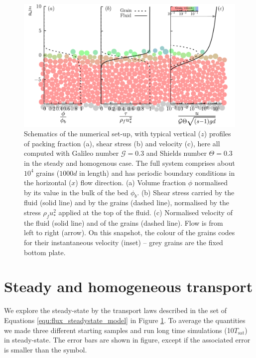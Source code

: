 \begin{figure}[H]
    \centering
    \includegraphics[width=0.9\linewidth]{04-figuras/TM-profiles.pdf}
    \caption[Transport profiles.]{Schematics of the numerical set-up, with typical vertical ($z$) profiles of packing fraction (a), shear stress (b) and velocity (c), here all computed with Galileo number $\mathcal{G}=0.3$ and Shields number $\Theta=0.3$ in the steady and homogenous case. The full system comprises about $10^4$ grains ($1000d$ in length) and has periodic boundary conditions in the horizontal ($x$) flow direction. (a) Volume fraction $\phi$ normalised by its value in the bulk of the bed $\phi_b$. (b) Shear stress carried by the fluid (solid line) and by the grains (dashed line), normalised by the stress $\rho_f u_*^2$ applied at the top of the fluid. (c) Normalised velocity of the fluid (solid line) and of the grains (dashed line). Flow is from left to right (arrow). On this snapshot, the colour of the grains codes for their instantaneous velocity (inset) -- grey grains are the fixed bottom plate.}
    \label{fig:TM_profiles}
\end{figure}

\section{Steady and homogeneous transport}
    We explore the steady-state by the transport laws described in the set of Equations \ref{equ:flux_steadystate_model} in Figure \ref{fig:TM_profiles}. To average the quantities we made three different starting samples and run long time simulations (10$T_\textrm{sat}$) in steady-state. The error bars are shown in figure, except if the associated error is smaller than the symbol.


